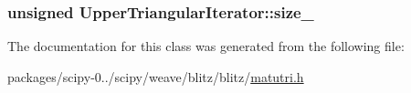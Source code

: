\subsubsection[{size\+\_\+}]{\setlength{\rightskip}{0pt plus 5cm}unsigned Upper\+Triangular\+Iterator\+::size\+\_\+\hspace{0.3cm}{\ttfamily [protected]}}\label{classUpperTriangularIterator_a0c6e58c284e4e65c2017666da3831573}


The documentation for this class was generated from the following file\+:\begin{DoxyCompactItemize}
\item 
packages/scipy-\/0../scipy/weave/blitz/blitz/\hyperlink{matutri_8h}{matutri.\+h}\end{DoxyCompactItemize}
